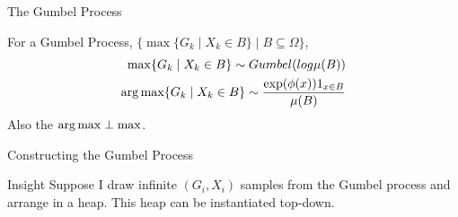 \begin{frame}{The Gumbel Process}
  \footnotesize{
      \begin{property}
        For a Gumbel Process, $\{ \max \{G_k \mid X_k \in B\} \mid B \subseteq \Omega\}$,
        \begin{align*}
          \max \{G_k \mid X_k \in B\} \sim Gumbel(log \mu(B)) \\
      \operatorname*{{arg\,max}} \{G_k \mid X_k \in B\} \sim \frac{\exp(\phi(x))1_{x \in B}}{\mu(B)}
        \end{align*}
      Also the $\operatorname*{{arg\,max}} \perp \max$.
      \end{property}
    }
\end{frame}

\begin{frame}{Constructing the Gumbel Process}
  \begin{exampleblock}{Insight}
    Suppose I draw infinite $(G_i,X_i)$ samples from the Gumbel process and arrange in a heap.
    This heap can be instantiated top-down.
  \end{exampleblock}
\end{frame}


